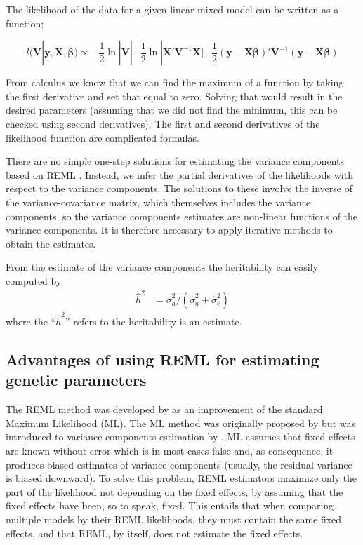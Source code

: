 \documentclass[
]{book}
\newcommand{\matr}[1]{\mathbf{#1}}  %
\newcommand{\vect}[1]{\mathbf{#1}}  %
\newcommand{\bfbeta}{{\boldsymbol\beta}}
\begin{document}
The likelihood of the data for a given linear mixed model can be written as a function;

\begin{equation} 
    l(\matr{V}|\vect{y}, \matr{X}, \bfbeta) 
    \propto
     -\frac{1}{2}\ln|\matr{V}|
     -\frac{1}{2}\ln|\matr{X'V}^{-1}\matr{X}|
     -\frac{1}{2}(\vect{y}-\matr{X}{\bfbeta})'\matr{V}^{-1}(\vect{y}-\matr{X}{\bfbeta})
    \label{eq:reml.likelihood}
\end{equation}

From calculus we know that we can find the maximum of a function by taking the first
derivative and set that equal to zero. Solving that would result in the desired
parameters (assuming that we did not find the minimum, this can be checked using
second derivatives). The first and second derivatives of the likelihood function
are complicated formulas.

There are no simple one-step solutions for estimating the variance components based on REML \citep{LynchWalsh1998}. Instead, we infer the partial derivatives of the likelihoods with respect to the variance components. The solutions to these involve the inverse of the variance-covariance matrix, which themselves includes the variance components, so the variance components estimates are non-linear functions of the variance components. It is therefore necessary to apply iterative methods to obtain the estimates.

From the estimate of the variance components the heritability can easily computed by
\begin{align}
\hat{h}^2 &= \hat{\sigma}^2_{a}/(\hat{\sigma}^2_a+\hat{\sigma}^2_e)
\end{align}
where the ``\(\hat{h}^2\)'' refers to the heritability is an estimate.

\hypertarget{advantages-of-using-reml-for-estimating-genetic-parameters}{%
\subsection{Advantages of using REML for estimating genetic parameters}\label{advantages-of-using-reml-for-estimating-genetic-parameters}}

The REML method was developed by \citet{Patterson1971} as an improvement of the standard Maximum Likelihood (ML). The ML method was originally proposed by \citet{Fisher1922} but was introduced to variance components estimation by \citet{Hartley1967}. ML assumes that fixed effects are known without error which is in most cases false and, as consequence, it produces biased estimates of variance components (usually, the residual variance is biased downward). To solve this problem, REML estimators maximize only the part of the likelihood not depending on the fixed effects,
by assuming that the fixed effects have been, so to speak, fixed. This entails that when comparing multiple models by their REML likelihoods, they must contain the same fixed effects,
and that REML, by itself, does not estimate the fixed effects.
\end{document}
